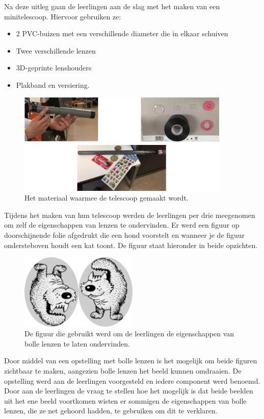 \documentclass[a4paper,12pt,twoside]{article}%
\begin{document}
	Na deze uitleg gaan de leerlingen aan de slag met het maken van een minitelescoop. Hiervoor gebruiken ze:
	\begin{itemize}
		\item 2 PVC-buizen met een verschillende diameter die in elkaar schuiven
		\item Twee verschillende lenzen
		\item 3D-geprinte lenshouders
		\item Plakband en versiering.
	\end{itemize}
	\begin{figure}[!h]
		\centering
		\includegraphics[width=0.9\textwidth]{Telescoop}
		\caption{Het materiaal waarmee de telescoop gemaakt wordt.}
		\label{Fig::Telescoop}
	\end{figure}
	Tijdens het maken van hun telescoop werden de leerlingen per drie meegenomen om zelf de eigenschappen van lenzen te ondervinden. Er werd een figuur op doorschijnende folie afgedrukt die een hond voorstelt en wanneer je de figuur ondersteboven houdt een kat toont. De figuur staat hieronder in beide opzichten.
	
	\begin{figure}[!h]
		\centering
		\includegraphics[width=0.5\textwidth]{HondKat}
		\caption{De figuur die gebruikt werd om de  leerlingen de eigenschappen van bolle lenzen te laten ondervinden.}
		\label{Fig::HondKat}
	\end{figure}
	Door middel van een opstelling met bolle lenzen is het mogelijk om beide figuren zichtbaar te maken, aangezien bolle lenzen het beeld kunnen omdraaien. De opstelling werd aan de leerlingen voorgesteld en iedere component werd benoemd. Door aan de  leerlingen de vraag te stellen hoe het mogelijk is dat beide beelden uit het ene beeld voortkomen wisten er sommigen de eigenschappen van bolle lenzen, die ze net gehoord hadden, te gebruiken om dit te verklaren. 
	
\end{document}
